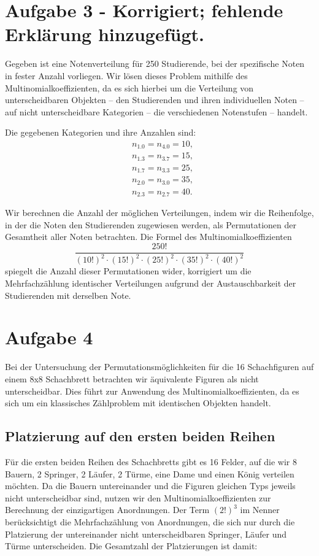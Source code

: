 \documentclass{article}
\begin{document}

\section*{Aufgabe 3 - Korrigiert; fehlende Erklärung hinzugefügt.}

Gegeben ist eine Notenverteilung für 250 Studierende, bei der spezifische Noten in fester Anzahl vorliegen. Wir lösen dieses Problem mithilfe des Multinomialkoeffizienten, da es sich hierbei um die Verteilung von unterscheidbaren Objekten – den Studierenden und ihren individuellen Noten – auf nicht unterscheidbare Kategorien – die verschiedenen Notenstufen – handelt.

Die gegebenen Kategorien und ihre Anzahlen sind:
\begin{align*}
	 & n_{1.0} = n_{4.0} = 10, \\
	 & n_{1.3} = n_{3.7} = 15, \\
	 & n_{1.7} = n_{3.3} = 25, \\
	 & n_{2.0} = n_{3.0} = 35, \\
	 & n_{2.3} = n_{2.7} = 40.
\end{align*}

Wir berechnen die Anzahl der möglichen Verteilungen, indem wir die Reihenfolge, in der die Noten den Studierenden zugewiesen werden, als Permutationen der Gesamtheit aller Noten betrachten. Die Formel des Multinomialkoeffizienten
\[
	\frac{250!}{(10!)^2 \cdot (15!)^2 \cdot (25!)^2 \cdot (35!)^2 \cdot (40!)^2}
\]
spiegelt die Anzahl dieser Permutationen wider, korrigiert um die Mehrfachzählung identischer Verteilungen aufgrund der Austauschbarkeit der Studierenden mit derselben Note.

\section*{Aufgabe 4}

Bei der Untersuchung der Permutationsmöglichkeiten für die 16 Schachfiguren auf einem 8x8 Schachbrett betrachten wir äquivalente Figuren als nicht unterscheidbar. Dies führt zur Anwendung des Multinomialkoeffizienten, da es sich um ein klassisches Zählproblem mit identischen Objekten handelt.

\subsection*{Platzierung auf den ersten beiden Reihen}
Für die ersten beiden Reihen des Schachbretts gibt es 16 Felder, auf die wir 8 Bauern, 2 Springer, 2 Läufer, 2 Türme, eine Dame und einen König verteilen möchten. Da die Bauern untereinander und die Figuren gleichen Typs jeweils nicht unterscheidbar sind, nutzen wir den Multinomialkoeffizienten zur Berechnung der einzigartigen Anordnungen. Der Term \( (2!)^3 \) im Nenner berücksichtigt die Mehrfachzählung von Anordnungen, die sich nur durch die Platzierung der untereinander nicht unterscheidbaren Springer, Läufer und Türme unterscheiden. Die Gesamtzahl der Platzierungen ist damit:
\end{document}
